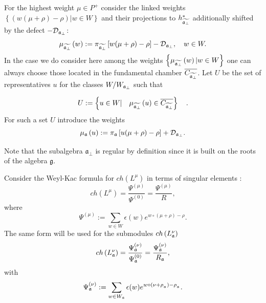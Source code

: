\documentclass[12pt]{article}
\theoremstyle{definition}
\newcommand{\gf}{\mathfrak{g}}
\newcommand{\afb}{\mathfrak{a}_{\bot}}
\begin{document}
For the highest weight $\mu \in P^{+}$ consider the linked weights $\left\{
\left( w(\mu +\rho )-\rho \right) |w\in W\right\} $ and their projections to 
$h_{\widetilde{\frak{a}_{\perp }}}^{\ast }$ additionally shifted by the
defect $-\mathcal{D}_{\frak{a}_{\perp }}$: 
\[
\mu _{\widetilde{\frak{a}_{\perp }}}\left( w\right) :=\pi _{\widetilde{\frak{%
a}_{\perp }}}\left[ w(\mu +\rho )-\rho \right] -\mathcal{D}_{\frak{a}_{\perp
}},\quad w\in W. 
\]
In the case we do consider here among the weights $\left\{ \mu _{\widetilde{%
\frak{a}_{\perp }}}\left( w\right) |w\in W\right\} $ one can always choose
those located in the fundamental chamber $\overline{C_{\widetilde{\frak{a}%
_{\perp }}}}$. Let $U$ be the set of representatives $u$ for the classes $%
W/W_{\frak{a}_{\perp }}$ such that

\begin{equation}
U:=\left\{ u\in W|\quad \mu _{\widetilde{\frak{a}_{\perp }}}\left( u\right)
\in \overline{C_{\widetilde{\frak{a}_{\perp }}}}\right\} \quad .
\label{U-def}
\end{equation}
For such a set $U$ introduce the weights 
\[
\mu _{\frak{a}}\left( u\right) :=\pi _{\frak{a}}\left[ u(\mu +\rho )-\rho %
\right] +\mathcal{D}_{\frak{a}_{\perp }}. 
\]

Note that the subalgebra $\afb$ is regular by definition since it is built on the roots of the
algebra $\gf$.

Consider the Weyl-Kac formula for $ch\left( L^{\mu }\right) $ in terms of
singular elements \cite{humphreys1997introduction}: 
\begin{equation}
ch\left( L^{\mu }\right) =\frac{\Psi ^{\left( \mu \right) }}{\Psi ^{\left(
0\right) }}=\frac{\Psi ^{\left( \mu \right) }}{R},  \label{Weyl-Kac2}
\end{equation}
where 
\[
\Psi ^{\left( \mu \right) }:=\sum\limits_{w\in W}\epsilon (w)e^{w\circ (\mu
+\rho )-\rho }. 
\]
The same form will be used for the submodules $ch\left( L_{\frak{a}}^{\nu
}\right) $%
\[
ch\left( L_{\frak{a}}^{\nu }\right) =\frac{\Psi _{\frak{a}}^{\left( \nu
\right) }}{\Psi _{\frak{a}}^{\left( 0\right) }}=\frac{\Psi _{\frak{a}%
}^{\left( \nu \right) }}{R_{\frak{a}}}, 
\]
with 
\[
\Psi _{\frak{a}}^{\left( \nu \right) }:=\sum\limits_{w\in W_{\frak{a}%
}}\epsilon (w)e^{w\circ (\nu +\rho _{_{\frak{a}}})-\rho _{_{\frak{a}}}}. 
\]
\end{document}
